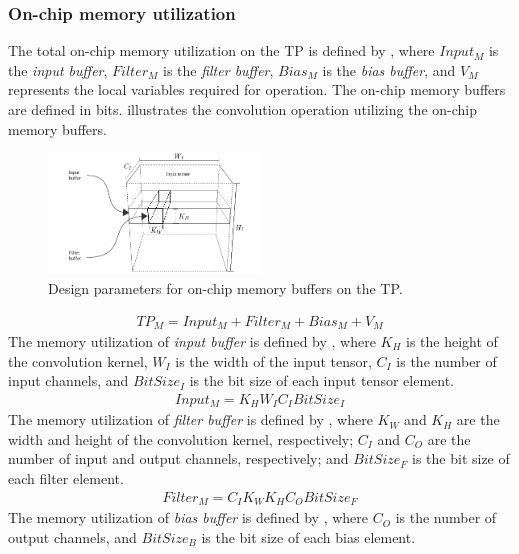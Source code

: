 \subsubsection{\textbf{On-chip memory utilization}}
The total on-chip memory utilization on the TP is defined by , where $Input_{M}$ is the \emph{input buffer}, $Filter_{M}$ is the \emph{filter buffer}, $Bias_{M}$ is the \emph{bias buffer}, and $V_{M}$ represents the local variables required for operation. The on-chip memory buffers are defined in bits.  illustrates the convolution operation utilizing the on-chip memory buffers.
\begin{figure}[t!]
	\centering
	\includegraphics[width=0.5\textwidth]{../figures/accelerator_buffers.pdf}
	\caption{Design parameters for on-chip memory buffers on the TP.}
	\label{fig:accelerator_buffers}
\end{figure}
\begin{eqnarray} \label{eq:tp_memory}
TP_{M}=Input_{M}+Filter_{M}+Bias_{M}+V_{M}
\end{eqnarray}
The memory utilization of \emph{input buffer} is defined by , where $K_{H}$ is the height of the convolution kernel, $W_{I}$ is the width of the input tensor, $C_{I}$ is the number of input channels, and $BitSize_{I}$ is the bit size of each input tensor element.
\begin{eqnarray} \label{eq:input_memory}
Input_{M}=K_{H}W_{I}C_{I}BitSize_{I}
\end{eqnarray}
The memory utilization of \emph{filter buffer} is defined by , where $K_{W}$ and $K_{H}$ are the width and height of the convolution kernel, respectively; $C_{I}$ and $C_{O}$ are the number of input and output channels, respectively; and $BitSize_{F}$ is the bit size of each filter element.
\begin{eqnarray} \label{eq:filter_memory}
Filter_{M}=C_{I}K_{W}K_{H}C_{O}BitSize_{F}
\end{eqnarray}
The memory utilization of \emph{bias buffer} is defined by , where $C_{O}$ is the number of output channels, and $BitSize_{B}$ is the bit size of each bias element.
